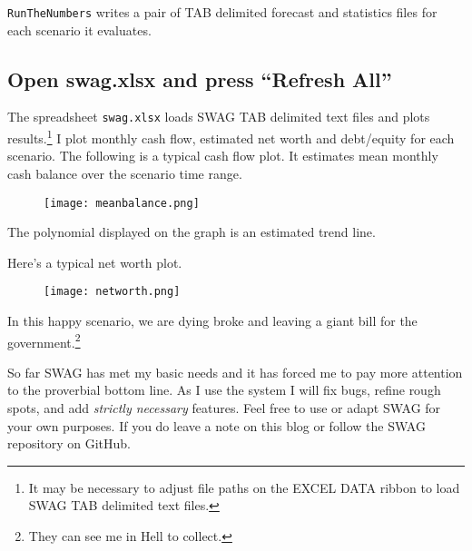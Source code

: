 \noindent \texttt{RunTheNumbers} writes a pair of TAB delimited forecast and
statistics files for each scenario it evaluates.

\subsection*{Open swag.xlsx and press ``Refresh All''}

The spreadsheet \texttt{swag.xlsx} loads SWAG TAB delimited text files
and plots results.\footnote{It may be necessary to adjust file paths on
  the EXCEL DATA ribbon to load SWAG TAB delimited text files.} I plot
monthly cash flow, estimated net worth and debt/equity for each
scenario. The following is a typical cash flow plot. It estimates mean
monthly cash balance over the scenario time range.


\begin{figure}[htbp]
\centering
\texttt{[image: meanbalance.png]}
\label{fig:5175X1}
\end{figure}

\noindent The polynomial displayed on the graph is an estimated trend line.

\noindent Here's a typical net worth plot.


\begin{figure}[htbp]
\centering
\texttt{[image: networth.png]}
\label{fig:5175X2}
\end{figure}

\noindent In this happy scenario, we are dying broke and leaving a giant bill for
the government.\footnote{They can see me in Hell to collect.}

So far SWAG has met my basic needs and it has forced me to pay more
attention to the proverbial bottom line. As I use the system I will fix
bugs, refine rough spots, and add \emph{strictly necessary} features.
Feel free to use or adapt SWAG for your own purposes. If you do leave a
note on this blog or follow the SWAG repository on GitHub.

%
